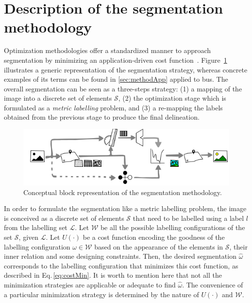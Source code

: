 \graphicspath{ {./content/method/figures/visual_cues/}{./content/method/figures/}}

\section{Description of the segmentation methodology}\label{sec:method}

Optimization methodologies offer a standardized manner to approach segmentation by minimizing an application-driven cost function~\cite{cremers2007review}.
Figure~\ref{fig:method} illustrates a generic representation of the segmentation strategy, whereas concrete examples of its terms can be found in \cref{sec:methodApp} applied to \ac{bus}.
The overall segmentation can be seen as a three-steps strategy: 
(1) a mapping of the image into a discrete set of elements $\mathcal{S}$, 
(2) the optimization stage which is formulated as a \emph{metric labelling} problem, 
and (3) a re-mapping the labels obtained from the previous stage to produce the final delineation. 

\begin{figure}[htpb]
  \centering
  \includegraphics[width=0.9\linewidth]{method}
  \caption{Conceptual block representation of the segmentation methodology.
  }
  \label{fig:method}
\end{figure}


In order to formulate the segmentation like a metric labelling problem, the image is conceived as a discrete set of elements $\mathcal{S}$ that need to be labelled using a label $l$ from the labelling set $\mathcal{L}$.
Let $\mathcal{W}$ be all the possible labelling configurations of the set $\mathcal{S}$, given $\mathcal{L}$.
Let $U(\cdot)$ be a cost function encoding the goodness of the labelling configuration $\omega \in \mathcal{W}$ based on the appearance of the elements in $\mathcal{S}$, their inner relation and some designing constraints.
Then, the desired segmentation $\hat{\omega}$ corresponds to the labelling configuration that minimizes this cost function, as described in Eq.\,\eqref{eq:costMin}.
It is worth to mention here that not all the minimization strategies are applicable or adequate to find $\hat{\omega}$.
The convenience of a particular minimization strategy is determined by the nature of $U(\cdot)$ and $\mathcal{W}$. %

